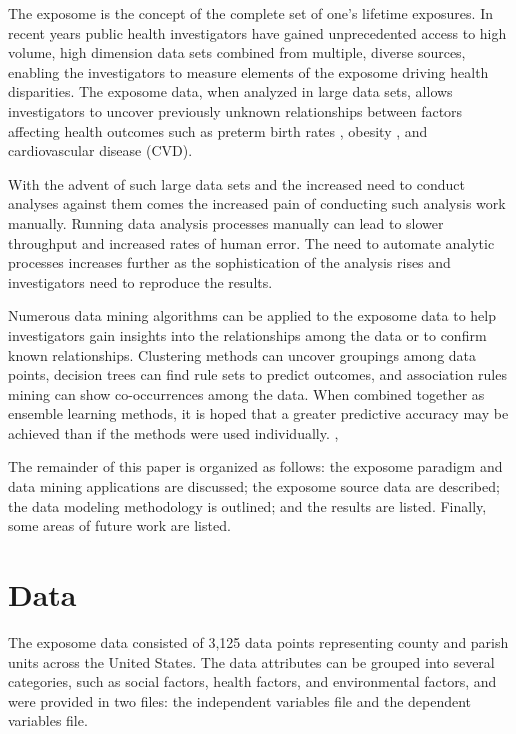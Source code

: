 \documentclass[conference,compsoc]{IEEEtran}
\begin{document}
The exposome is the concept of the complete set of one's lifetime exposures. \cite{juarez} In recent years public health investigators have gained 
unprecedented access to high volume, high dimension data sets combined from multiple, diverse sources,
enabling the investigators to measure elements of the exposome driving health disparities. The exposome data,
when analyzed in large data sets, allows investigators to uncover previously unknown relationships between factors affecting 
health outcomes such as preterm birth rates \cite{kershenbaum},
obesity \cite{raman}, and cardiovascular disease (CVD).

With the advent of such large data sets and the increased need to conduct analyses against them comes the increased pain of conducting such analysis work manually.
Running data analysis processes manually can lead to slower throughput and increased rates of human error. The need to automate analytic processes increases further
as the sophistication of the analysis rises and investigators need to reproduce the results.

Numerous data mining algorithms can be applied to the exposome data to help investigators gain insights into the relationships among the data or to confirm known
relationships. Clustering methods can uncover groupings among data points, decision trees can find rule sets to predict outcomes, and association rules mining can
show co-occurrences among the data. When combined together as ensemble learning methods, it is hoped that a greater predictive accuracy may be achieved than
if the methods were used individually. \cite{bramer}, \cite{aggarwal}

The remainder of this paper is organized as follows: the exposome paradigm and data mining applications
are discussed; the exposome source data are described; the data modeling methodology is outlined;
and the results are listed. Finally, some areas of future work are listed.

\section{Data}

The exposome data consisted of 3,125 data points representing county and parish units across the United States. 
The data attributes can be grouped into several categories, such as social factors, health factors, and environmental factors,
and were provided in two files: the independent variables file and the dependent variables file.
\end{document}
